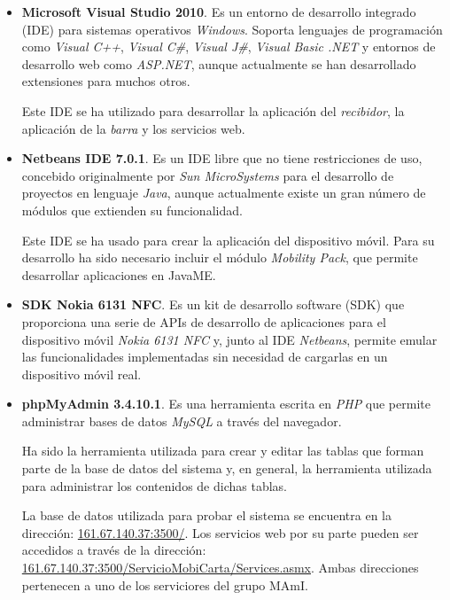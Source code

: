   \begin{itemize}
    \item \textbf{Microsoft Visual Studio 2010}.
    Es un entorno de desarrollo integrado (\acs{IDE}) para sistemas operativos
    \emph{Windows}. Soporta lenguajes de programación como \emph{Visual C++},
    \emph{Visual C\#}, \emph{Visual J\#}, \emph{Visual Basic .NET} y
    entornos de desarrollo web como \emph{ASP.NET}, aunque actualmente
    se han desarrollado extensiones para muchos otros.

    Este \acs{IDE} se ha utilizado para desarrollar la aplicación del
    \emph{recibidor}, la aplicación de la \emph{barra} y los servicios web.
    
    \item \textbf{Netbeans IDE 7.0.1}.
    Es un \acs{IDE} libre que no tiene restricciones de uso, concebido 
    originalmente por \emph{Sun MicroSystems} para el desarrollo de proyectos
    en lenguaje \emph{Java}, aunque actualmente existe un gran número de 
    módulos que extienden su funcionalidad.

    Este \acs{IDE} se ha usado para crear la aplicación del dispositivo móvil.
    Para su desarrollo ha sido necesario incluir el módulo \emph{Mobility 
    Pack}, que permite desarrollar aplicaciones en \acs{JavaME}.

    \item \textbf{SDK Nokia 6131 NFC}. 
    Es un kit de desarrollo software (\acs{SDK}) que proporciona una serie
    de \acs{API}s de desarrollo de aplicaciones para el dispositivo móvil
    \emph{Nokia 6131 \acs{NFC}} y, junto al \acs{IDE} \emph{Netbeans},
    permite emular las funcionalidades implementadas sin necesidad de
    cargarlas en un dispositivo móvil real.
    
    \item \textbf{phpMyAdmin 3.4.10.1}.
    Es una herramienta escrita en \emph{PHP} que permite administrar bases
    de datos \emph{MySQL} a través del navegador.

    Ha sido la herramienta utilizada para crear y editar las tablas que
    forman parte de la base de datos del sistema y, en general, la herramienta
    utilizada para administrar los contenidos de dichas tablas.

    La base de datos utilizada para probar el sistema se encuentra en la
    dirección: \url{161.67.140.37:3500/}.
    Los servicios web por su parte
    pueden ser accedidos a través de la dirección:
    \url{161.67.140.37:3500/ServicioMobiCarta/Services.asmx}. Ambas
    direcciones pertenecen a uno de los serviciores del grupo \acs{MAmI}.
  \end{itemize}

